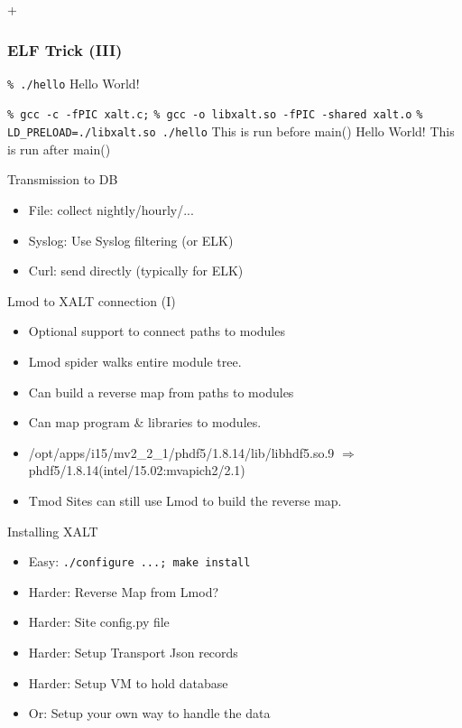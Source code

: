 +\documentclass{beamer}
\begin{document}
\begin{frame}[fragile]
    \frametitle{ELF Trick (III)}
 {\small
    \begin{semiverbatim}
{\color{red}\texttt{\% ./hello}}
Hello World!

{\color{red}\texttt{\% gcc -c -fPIC xalt.c;}}
{\color{red}\texttt{\% gcc -o libxalt.so -fPIC -shared xalt.o}}
{\color{red}\texttt{\% LD\_PRELOAD=./libxalt.so ./hello}}
This is run before main()
Hello World!
This is run after main()
    \end{semiverbatim}
}
\end{frame}

\begin{frame}{Transmission to DB}
  \begin{itemize}
    \item File: collect nightly/hourly/...
    \item Syslog: Use Syslog filtering (or ELK)
    \item Curl: send directly (typically for ELK)
  \end{itemize}
\end{frame}

\begin{frame}{Lmod to XALT connection (I)}
  \begin{itemize}
    \item Optional support to connect paths to modules
    \item Lmod spider walks entire module tree.
    \item Can build a reverse map from paths to modules
    \item Can map program \& libraries to modules.
    \item /opt/apps/i15/mv2\_2\_1/phdf5/1.8.14/lib/libhdf5.so.9
      $\Rightarrow$ phdf5/1.8.14(intel/15.02:mvapich2/2.1)
    \item Tmod Sites can still use Lmod to build the reverse map.
  \end{itemize}
\end{frame}

\begin{frame}{Installing XALT}
  \begin{itemize}
    \item Easy: \texttt{./configure ...; make install}
    \item Harder: Reverse Map from Lmod?
    \item Harder: Site config.py file
    \item Harder: Setup Transport Json records
    \item Harder: Setup VM to hold database
    \item Or: Setup your own way to handle the data
  \end{itemize}
\end{frame}
\end{document}
